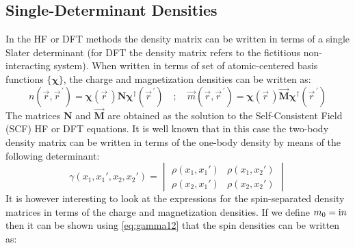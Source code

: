 \documentclass[12pt]{article}
\newcommand{\iu}{\ensuremath\mathrm{i}}
\begin{document}
\subsection{Single-Determinant Densities}
In the HF or DFT methods the density matrix can be written in terms of a single Slater determinant (for DFT the density matrix refers to the fictitious non-interacting system).
When written in terms of set of atomic-centered basis functions $\{\bm{\chi}\}$, the charge and magnetization densities can be written as:
\begin{equation}
 n(\vec{r},\vec{r}^{\,\prime}) = \bm{\chi}(\vec{r}\,)\mathbf{N}\bm{\chi}^\dagger(\vec{r}^{\,\prime}) \quad;\quad
 \vec{m}(\vec{r},\vec{r}^{\,\prime}) = \bm{\chi}(\vec{r}\,)\vec{\mathbf{M}}\bm{\chi}^\dagger(\vec{r}^{\,\prime})
\end{equation}
The matrices $\mathbf{N}$ and $\vec{\mathbf{M}}$ are obtained as the solution to the Self-Consistent Field (SCF) HF or DFT equations.
It is well known that in this case the two-body density matrix can be written in terms of the one-body density by means of the following determinant:
\begin{equation}
 \gamma(x_1,x_1',x_2,x_2') = \begin{vmatrix} \rho(x_1,x_1') & \rho(x_1,x_2') \\\rho(x_2,x_1') & \rho(x_2,x_2') \end{vmatrix}
\end{equation}
It is however interesting to look at the expressions for the spin-separated density matrices in terms of the charge and magnetization densities.
If we define $m_0=\iu n$ then it can be shown using \cref{eq:gamma12} that the spin densities can be written as:
\end{document}
